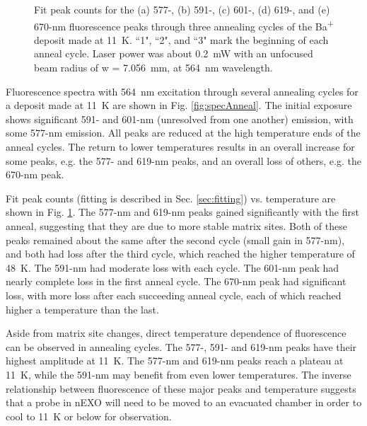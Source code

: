 \begin{figure}
                \caption{Fit peak counts for the (a) 577-, (b) 591-, (c) 601-, (d) 619-, and (e) 670-nm fluorescence peaks through three annealing cycles of the Ba\textsuperscript{+} deposit made at 11~K.  ``1", ``2", and ``3" mark the beginning of each anneal cycle.  Laser power was about 0.2~mW with an unfocused beam radius of w = 7.056~mm, at 564~nm wavelength.}
\label{fig:annealGrn}
\end{figure}

Fluorescence spectra with 564~nm excitation through several annealing cycles for a deposit made at 11~K are shown in Fig. \ref{fig:specAnneal}.  The initial exposure shows significant 591- and 601-nm (unresolved from one another) emission, with some 577-nm emission.  All peaks are reduced at the high temperature ends of the anneal cycles.  The return to lower temperatures results in an overall increase for some peaks, e.g. the 577- and 619-nm peaks, and an overall loss of others, e.g. the 670-nm peak.  

Fit peak counts (fitting is described in Sec. \ref{sec:fitting}) vs. temperature are shown in Fig. \ref{fig:annealGrn}.  The 577-nm and 619-nm peaks gained significantly with the first anneal, suggesting that they are due to more stable matrix sites.  Both of these peaks remained about the same after the second cycle (small gain in 577-nm), and both had loss after the third cycle, which reached the higher temperature of 48~K.  The 591-nm had moderate loss with each cycle.  The 601-nm peak had nearly complete loss in the first anneal cycle.  The 670-nm peak had significant loss, with more loss after each succeeding anneal cycle, each of which reached higher a temperature than the last.




Aside from matrix site changes, direct temperature dependence of fluorescence can be observed in annealing cycles.  The 577-, 591- and 619-nm peaks have their highest amplitude at 11~K.  The 577-nm and 619-nm peaks reach a plateau at 11~K, while the 591-nm may benefit from even lower temperatures.  The inverse relationship between fluorescence of these major peaks and temperature suggests that a probe in nEXO will need to be moved to an evacuated chamber in order to cool to 11~K or below for observation.  

